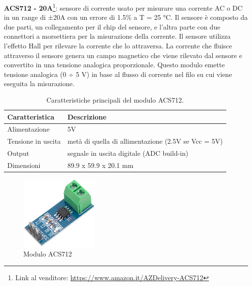 %
\textbf{ACS712 - 20A}\footnote{Link al venditore: \href{https://www.amazon.it/AZDelivery-corrente-sensore-Current-Raspberry/dp/B0736DYV3W?th=1}{https://www.amazon.it/AZDelivery-ACS712}}: sensore di corrente usato per misurare una corrente AC o DC in un range di ±20A con un errore di 1.5\% a T = 25 °C. Il sensore è composto da due parti, un collegamento per il chip del sensore, e l'altra parte con due connettori a morsettiera per la misurazione della corrente.
Il sensore utilizza l'effetto Hall per rilevare la corrente che lo attraversa. La corrente che fluisce attraverso il sensore genera un campo magnetico che viene rilevato dal sensore e convertito in una tensione analogica proporzionale. Questo modulo emette tensione analogica (0 ÷ 5 V) in base al flusso di corrente nel filo su cui viene eseguita la misurazione.
%
\begin{table}[H]
    \centering
    \begin{tabular}{|l|l|}
    \hline
    \textbf{Caratteristica} & \textbf{Descrizione}                                \\ \hline
    Alimentazione           & 5V                                                  \\ \hline
    Tensione in uscita      & metà di quella di allimentazione (2.5V se Vcc = 5V) \\ \hline
    Output                  & segnale in uscita digitale (ADC build-in)           \\ \hline
    Dimensioni              & 89.9 x 59.9 x 20.1 mm                               \\ \hline
    \end{tabular}
    \caption{\label{acs712-features}Caratteristiche principali del modulo ACS712.}
\end{table}

\begin{figure}[H]
    \begin{center}
      \includegraphics[width=0.35\textwidth]{images/sensors/acs712.png}
    \end{center}
    \caption{Modulo ACS712}
\end{figure}

